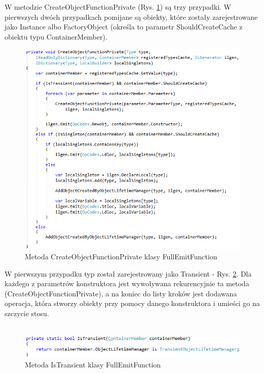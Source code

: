 \documentclass[12pt]{article}
\begin{document}
W metodzie CreateObjectFunctionPrivate (Rys. \ref{fig:FullEmitFunction_CreateObjectFunctionPrivate}) są trzy przypadki. W pierwszych dwóch przypadkach pomijane są obiekty, które zostały zarejestrowane jako Instance albo FactoryObject (określa to parametr ShouldCreateCache z obiektu typu ContainerMember).\\
\begin{figure}[H]
	\begin{center}
  		\includegraphics{FullEmitFunction_CreateObjectFunctionPrivate.png}
  		\caption{Metoda CreateObjectFunctionPrivate klasy FullEmitFunction}
  		\label{fig:FullEmitFunction_CreateObjectFunctionPrivate}
	\end{center}
\end{figure}

W pierwszym przypadku typ został zarejestrowany jako Transient -  Rys. \ref{fig:FullEmitFunction_IsTransient}. Dla każdego z parametrów konstruktora jest wywoływana rekurencyjnie ta metoda (CreateObjectFunctionPrivate), a na koniec do listy kroków jest dodawana operacja, która stworzy obiekty przy pomocy danego konstruktora i umieści go na szczycie stosu.\\ \\
\begin{figure}[H]
	\begin{center}
  		\includegraphics{FullEmitFunction_IsTransient.png}
  		\caption{Metoda IsTransient klasy FullEmitFunction}
  		\label{fig:FullEmitFunction_IsTransient}
	\end{center}
\end{figure}
\end{document}
